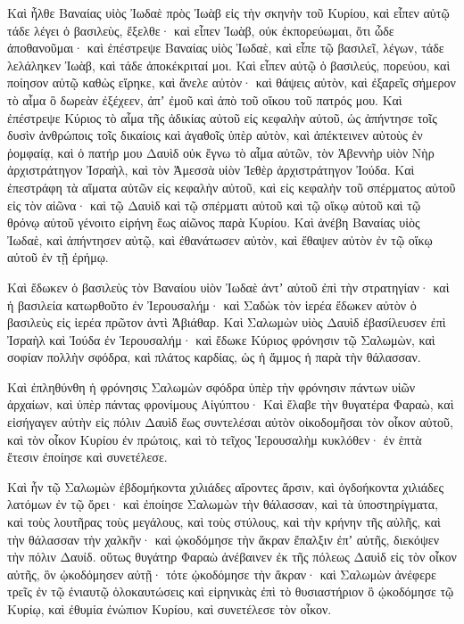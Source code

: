 {\par }{\PP {}Καὶ ἦλθε Βαναίας υἱὸς Ἰωδαὲ πρὸς Ἰωὰβ εἰς τὴν σκηνὴν τοῦ Κυρίου, καὶ εἶπεν αὐτῷ τάδε λέγει ὁ βασιλεὺς, ἔξελθε· καὶ εἶπεν Ἰωὰβ, οὐκ ἐκπορεύωμαι, ὅτι ὧδε ἀποθανοῦμαι· καὶ ἐπέστρεψε Βαναίας υἱὸς Ἰωδαὲ, καὶ εἶπε τῷ βασιλεῖ, λέγων, τάδε λελάληκεν Ἰωὰβ, καὶ τάδε ἀποκέκριταί μοι.
Καὶ εἶπεν αὐτῷ ὁ βασιλεύς, πορεύου, καὶ ποίησον αὐτῷ καθὼς εἴρηκε, καὶ ἄνελε αὐτὸν· καὶ θάψεις αὐτὸν, καὶ ἐξαρεῖς σήμερον τὸ αἷμα ὃ δωρεὰν ἐξέχεεν, ἀπʼ ἐμοῦ καὶ ἀπὸ τοῦ οἴκου τοῦ πατρός μου.
Καὶ ἐπέστρεψε Κύριος τὸ αἷμα τῆς ἀδικίας αὐτοῦ εἰς κεφαλὴν αὐτοῦ, ὡς ἀπήντησε τοῖς δυσὶν ἀνθρώποις τοῖς δικαίοις καὶ ἀγαθοῖς ὑπὲρ αὐτὸν, καὶ ἀπέκτεινεν αὐτοὺς ἐν ῥομφαίᾳ, καὶ ὁ πατήρ μου Δαυὶδ οὐκ ἔγνω τὸ αἷμα αὐτῶν, τὸν Ἀβεννὴρ υἱὸν Νὴρ ἀρχιστράτηγον Ἰσραὴλ, καὶ τὸν Ἀμεσσὰ υἱὸν Ἰεθὲρ ἀρχιστράτηγον Ἰούδα.
Καὶ ἐπεστράφη τὰ αἵματα αὐτῶν εἰς κεφαλὴν αὐτοῦ, καὶ εἰς κεφαλὴν τοῦ σπέρματος αὐτοῦ εἰς τὸν αἰῶνα· καὶ τῷ Δαυὶδ καὶ τῷ σπέρματι αὐτοῦ καὶ τῷ οἴκῳ αὐτοῦ καὶ τῷ θρόνῳ αὐτοῦ γένοιτο εἰρήνη ἕως αἰῶνος παρὰ Κυρίου.
Καὶ ἀνέβη Βαναίας υἱὸς Ἰωδαὲ, καὶ ἀπήντησεν αὐτῷ, καὶ ἐθανάτωσεν αὐτὸν, καὶ ἔθαψεν αὐτὸν ἐν τῷ οἴκῳ αὐτοῦ ἐν τῇ ἐρήμῳ.
\par }{\PP {}Καὶ ἔδωκεν ὁ βασιλεὺς τὸν Βαναίου υἱὸν Ἰωδαὲ ἀντʼ αὐτοῦ ἐπὶ τὴν στρατηγίαν· καὶ ἡ βασιλεία κατωρθοῦτο ἐν Ἰερουσαλήμ· καὶ Σαδὼκ τὸν ἱερέα ἔδωκεν αὐτὸν ὁ βασιλεὺς εἰς ἱερέα πρῶτον ἀντὶ Ἀβιάθαρ. Καὶ Σαλωμὼν υἱὸς Δαυὶδ ἐβασίλευσεν ἐπὶ Ἰσραὴλ καὶ Ἰούδα ἐν Ἱερουσαλήμ·
καὶ ἔδωκε Κύριος φρόνησιν τῷ Σαλωμὼν, καὶ σοφίαν πολλὴν σφόδρα, καὶ πλάτος καρδίας, ὡς ἡ ἄμμος ἡ παρὰ τὴν θάλασσαν.
\par }{\PP {}Καὶ ἐπληθύνθη ἡ φρόνησις Σαλωμὼν σφόδρα ὑπὲρ τὴν φρόνησιν πάντων υἱῶν ἀρχαίων, καὶ ὑπὲρ πάντας φρονίμους Αἰγύπτου·
Καὶ ἔλαβε τὴν θυγατέρα Φαραὼ, καὶ εἰσήγαγεν αὐτὴν εἰς πόλιν Δαυὶδ ἕως συντελέσαι αὐτὸν οἰκοδομῆσαι τὸν οἶκον αὐτοῦ, καὶ τὸν οἶκον Κυρίου ἐν πρώτοις, καὶ τὸ τεῖχος Ἱερουσαλὴμ κυκλόθεν· ἐν ἑπτὰ ἔτεσιν ἐποίησε καὶ συνετέλεσε.
\par }{\PP {}Καὶ ἦν τῷ Σαλωμὼν ἐβδομήκοντα χιλιάδες αἴροντες ἄρσιν, καὶ ὀγδοήκοντα χιλιάδες λατόμων ἐν τῷ ὄρει·
καὶ ἐποίησε Σαλωμὼν τὴν θάλασσαν, καὶ τὰ ὑποστηρίγματα, καὶ τοὺς λουτῆρας τοὺς μεγάλους, καὶ τοὺς στύλους, καὶ τὴν κρήνην τῆς αὐλῆς, καὶ τὴν θάλασσαν τὴν χαλκῆν· καὶ ᾠκοδόμησε τὴν ἄκραν ἔπαλξιν ἐπʼ αὐτῆς, διεκόψεν τὴν πόλιν Δαυίδ.
οὕτως θυγάτηρ Φαραὼ ἀνέβαινεν ἐκ τῆς πόλεως Δαυὶδ εἰς τὸν οἶκον αὐτῆς, ὃν ᾠκοδόμησεν αὐτῇ· τότε ᾠκοδόμησε τὴν ἄκραν·
καὶ Σαλωμὼν ἀνέφερε τρεῖς ἐν τῷ ἐνιαυτῷ ὁλοκαυτώσεις καὶ εἰρηνικὰς ἐπὶ τὸ θυσιαστήριον ὃ ᾠκοδόμησε τῷ Κυρίῳ, καὶ ἐθυμία ἐνώπιον Κυρίου, καὶ συνετέλεσε τὸν οἶκον.
}
